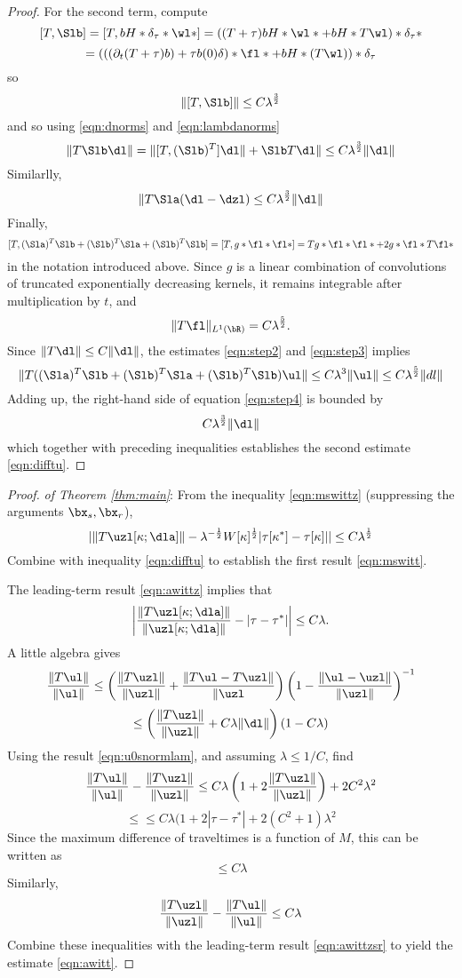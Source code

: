 \begin{proof}
For the second term, compute
\[
  [T, \Slb] = [T,bH*\delta_{\tau}*\wl*] = ((T+\tau)bH*\wl*
  + bH*T\wl)*\delta_{\tau}*
\]
\[
  = (((\partial_t (T+\tau)b) + \tau
  b(0)\delta)* \fl * + bH*(T\wl))*\delta_{\tau}
\]
so
\[
  \|[T,\Slb]\| \le C\lambda^{\frac{3}{2}}
\]
and so using \ref{eqn:dnorms} and \ref{eqn:lambdanorms}
\[
\|T\Slb \dl \|=  \|[T,(\Slb)^T]\dl \|+ \Slb T\dl\| \le C\lambda^{\frac{3}{2}}\|\dl\|
\]
Similarlly,
\[
\|T\Sla (\dl-\dzl) \le C \lambda^{\frac{3}{2}}\|\dl\|
\]
Finally,
\[
  [T, (\Sla)^T\Slb + (\Slb)^T\Sla + (\Slb)^T\Slb] = [T,g*\fl*\fl*] =
  Tg*\fl*\fl* + 2 g*\fl*T\fl*
\]
in the notation introduced above. Since $g$ is a linear combination of
convolutions of truncated exponentially decreasing kernels, it remains
integrable after multiplication by $t$, and
\[
\|T\fl\|_{L^1(\bR)} = C\lambda^{\frac{5}{2}}. 
\]
Since $\|T\dl\| \le C\|\dl\|$, the estimates \ref{eqn:step2} and \ref{eqn:step3} implies
\[
  \|T ((\Sla)^T\Slb + (\Slb)^T\Sla + (\Slb)^T\Slb)\ul\| \le
  C\lambda^{3}\|\ul\| \le C\lambda^{\frac{5}{2}} \|dl\|
\]
Adding up, the right-hand side of equation \ref{eqn:step4} is bounded
by
\[
  C \lambda^{\frac{3}{2}}\|\dl\|
\]
which together with preceding inequalities establishes the second estimate \ref{eqn:difftu}.

\end{proof}

\begin{proof} {\em of Theorem \ref{thm:main}}: From the inequality \ref{eqn:mswittz}
  (suppressing the arguments $\bx_s,\bx_r$),
  \[
   | \|T\uzl[\kappa;\dla] \|- 
   \lambda^{-\frac{1}{2}}
   W[\kappa]^{\frac{1}{2}}|\tau[\kappa^*]-\tau[\kappa]| | \le
   C\lambda^{\frac{1}{2}}
 \]
 Combine with inequality \ref{eqn:difftu} to establish the first
 result \ref{eqn:mswitt}.

 The leading-term result \ref{eqn:awittz} implies that
 \begin{equation}
   \label{eqn:awittzsr}
   \left| \frac{\|T\uzl[\kappa;\dla] \|}{
       \|\uzl[\kappa;\dla] \|} - |\tau-\tau^*|\right|  \le C\lambda.
 \end{equation}
 A little algebra gives
 \[
   \frac{\|T\ul\|}{\|\ul\|} \le \left(\frac{\|T\uzl\|}{\|\uzl\|}+\frac{\|T\ul
     -T\uzl\|}{\|\uzl}\right)\left(1-\frac{\|\ul-\uzl\|}{\|\uzl\|}\right)^{-1}
 \]
 \[
   \le \left(\frac{\|T\uzl\|}{\|\uzl\|} + C\lambda \|\dl\|\right) (1-C\lambda)
 \]
 Using the result \ref{eqn:u0snormlam}, and assuming $\lambda \le
 1/C$, find
 \[
 \frac{\|T\ul\|}{\|\ul\|}-\frac{\|T\uzl\|}{\|\uzl\|} \le C\lambda
 \left(1+2 \frac{\|T\uzl\|}{\|\uzl\|} \right) + 2 C^2 \lambda^2
\]
\[
  \le \le C\lambda  (1+2|\tau - \tau^*| + 2 (C^2+1) \lambda^2
\]
Since the maximum difference of traveltimes is a function of $M$, this
can be written as
\[
  \le C\lambda
\]
Similarly,
\[
  \frac{\|T\uzl\|}{\|\uzl\|}-\frac{\|T\ul\|}{\|\ul\|} \le C\lambda
\]
Combine these inequalities with the leading-term result
\ref{eqn:awittzsr} to yield the estimate \ref{eqn:awitt}.

\end{proof}


